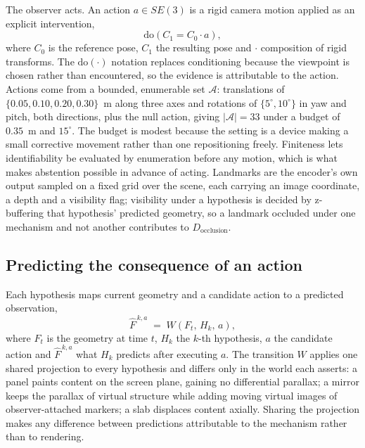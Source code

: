 The observer acts. An action $a \in SE(3)$ is a rigid camera motion applied as an
explicit intervention,
\begin{equation}
\label{eq:intervention}
\mathrm{do}\!\left(C_1 = C_0 \cdot a\right),
\end{equation}
where $C_0$ is the reference pose, $C_1$ the resulting pose and $\cdot$ composition
of rigid transforms. The $\mathrm{do}(\cdot)$ notation replaces conditioning
because the viewpoint is chosen rather than encountered, so the evidence is
attributable to the action. Actions come from a bounded, enumerable set $\mathcal{A}$: translations of
$\{0.05, 0.10, 0.20, 0.30\}$~m along three axes and rotations of
$\{5^\circ, 10^\circ\}$ in yaw and pitch, both directions, plus the null action,
giving $|\mathcal{A}| = 33$ under a budget of $0.35$~m and $15^\circ$. The budget is
modest because the setting is a device making a small corrective movement rather
than one repositioning freely. Finiteness lets identifiability be evaluated by
enumeration before any motion, which is what makes abstention possible in advance
of acting. Landmarks are the encoder's own output sampled on a fixed grid over the
scene, each carrying an image coordinate, a depth and a visibility flag; visibility
under a hypothesis is decided by z-buffering that hypothesis' predicted geometry,
so a landmark occluded under one mechanism and not another contributes to
$D_{\text{occlusion}}$.

\subsection{Predicting the consequence of an action}
\label{sec:transition}

Each hypothesis maps current geometry and a candidate action to a predicted
observation,
\begin{equation}
\label{eq:transition}
\hat{F}^{\,k,a} \;=\; W\!\left(F_t,\, H_k,\, a\right),
\end{equation}
where $F_t$ is the geometry at time $t$, $H_k$ the $k$-th hypothesis, $a$ the
candidate action and $\hat{F}^{\,k,a}$ what $H_k$ predicts after executing $a$. The
transition $W$ applies one shared projection to every hypothesis and differs only
in the world each asserts: a panel paints content on the screen plane, gaining no
differential parallax; a mirror keeps the parallax of virtual structure while
adding moving virtual images of observer-attached markers; a slab displaces content
axially. Sharing the projection makes any difference between predictions
attributable to the mechanism rather than to rendering.

